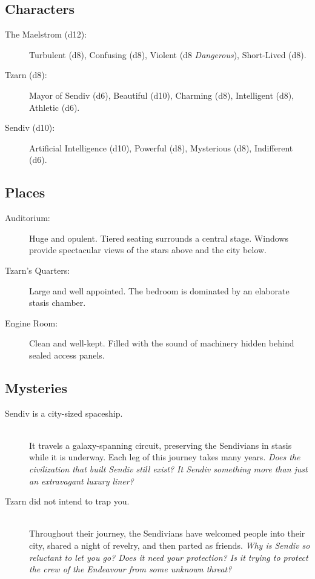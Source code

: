 \documentclass[11pt, a5paper, parskip=half-, DIV=12]{scrartcl}
\begin{document}
\newpage

\subsection*{Characters}
\begin{description}
	\item[The Maelstrom (d12):] Turbulent (d8), Confusing (d8), Violent (d8 \textit{Dangerous}), Short-Lived (d8).
	\item[Tzarn (d8):] Mayor of Sendiv (d6), Beautiful (d10), Charming (d8), Intelligent (d8), Athletic (d6).
	\item[Sendiv (d10):] Artificial Intelligence (d10), Powerful (d8), Mysterious (d8), Indifferent (d6).
\end{description}

\subsection*{Places}
\begin{description}
	\item[Auditorium:] Huge and opulent. Tiered seating surrounds a central stage. Windows provide spectacular views of the stars above and the city below.
	\item[Tzarn's Quarters:] Large and well appointed. The bedroom is dominated by an elaborate stasis chamber.
	\item[Engine Room:] Clean and well-kept. Filled with the sound of machinery hidden behind sealed access panels.
\end{description}

\subsection*{Mysteries}
\begin{description}
	\item[Sendiv is a city-sized spaceship.] \phantom{a} \\ It travels a galaxy-spanning circuit, preserving the Sendivians in stasis while it is underway. Each leg of this journey takes many years. \textit{Does the civilization that built Sendiv still exist? It Sendiv something more than just an extravagant luxury liner?}
	\item[Tzarn did not intend to trap you.] \phantom{a} \\ Throughout their journey, the Sendivians have welcomed people into their city, shared a night of revelry, and then parted as friends. \textit{Why is Sendiv so reluctant to let you go? Does it need your protection? Is it trying to protect the crew of the Endeavour from some unknown threat?}
\end{description}
\end{document}

